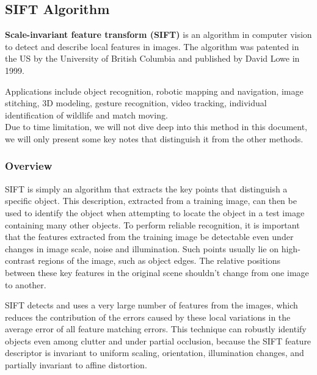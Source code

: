 \documentclass[a4paper,12pt]{report}
\begin{document}
			      
			      
		\subsection{SIFT Algorithm}
			      
			      \textbf{Scale-invariant feature transform (SIFT)} is an algorithm in computer vision to detect and describe local features in images. The algorithm was patented in the US by the University of British Columbia \cite{uspatent_sift} and published by David Lowe in 1999.\cite{Lowe_David}

			      Applications include object recognition, robotic mapping and navigation, image stitching, 3D modeling, gesture recognition, video tracking, individual identification of wildlife and match moving. \\
			      
			      Due to time limitation, we will not dive deep into this method in this document, we will only present some key notes that distinguish it from the other methods.
			      
			      \subsubsection{Overview}
			      
			      SIFT is simply an algorithm that extracts the key points that distinguish a specific object. This description, extracted from a training image, can then be used to identify the object when attempting to locate the object in a test image containing many other objects.
			      To perform reliable recognition, it is important that the features extracted from the training image be detectable even under changes in image scale, noise and illumination. Such points usually lie on high-contrast regions of the image, such as object edges.
			      The relative positions between these key features in the original scene shouldn't change from one image to another.
			  
			      SIFT detects and uses a very large number of features from the images, which reduces the contribution of the errors caused by these local variations in the average error of all feature matching errors.
			      This technique can robustly identify objects even among clutter and under partial occlusion, because the SIFT feature descriptor is invariant to uniform scaling, orientation, illumination changes, and partially invariant to affine distortion.\cite{uspatent_sift}
			      
\end{document}
